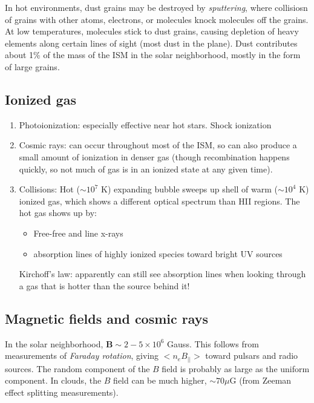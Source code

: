 \documentclass[11pt]{article}
\newcommand{\mar}[1]{\hspace{0pt}\marginpar{-\textcolor{black}{#1}-}}
\begin{document}
In hot environments, dust grains may be destroyed by \textit{sputtering}, where
collisiosn of grains with other atoms, electrons, or molecules knock molecules
off the grains. \mar{9}At low temperatures, molecules stick to dust grains,
causing depletion of heavy elements along certain lines of sight (most dust in
the plane). Dust contributes about 1\% of the mass of the ISM in the solar
neighborhood, mostly in the form of large grains.

\subsection{Ionized gas}
\begin{enumerate}[label=\alph*)]
    \item Photoionization: especially effective near hot stars. Shock
        ionization
    \item Cosmic rays: can occur throughout most of the ISM, so can also
        produce a small amount of ionization in denser gas (though
        recombination happens quickly, so not much of gas is in an
        ionized state at any given time).
    \item \mar{11}Collisions: Hot ($\sim 10^{7}$ K) expanding bubble
        sweeps up shell of warm ($\sim 10^{4}$ K) ionized gas, which shows
        a different optical spectrum than HII regions. The hot gas shows
        up by:
        \begin{itemize}
            \item Free-free and line x-rays
            \item absorption lines of highly ionized species toward
                bright UV sources
        \end{itemize}
        Kirchoff's law: apparently can still see absorption lines when looking
        through a gas that is hotter than the source behind it!
\end{enumerate}

\subsection{Magnetic fields and cosmic rays}
\mar{13}In the solar neighborhood, $\mathbf{B} \sim 2-5\times10^{6}$ Gauss.
This follows from measurements of \textit{Faraday rotation}, giving
$<n_{e}B_{||}>$ toward pulsars and radio sources. The random component of
the $B$ field is probably as large as the uniform component. In clouds,
the $B$ field can be much higher, $\sim 70 \mu$G (from Zeeman effect splitting
measurements).
\end{document}
